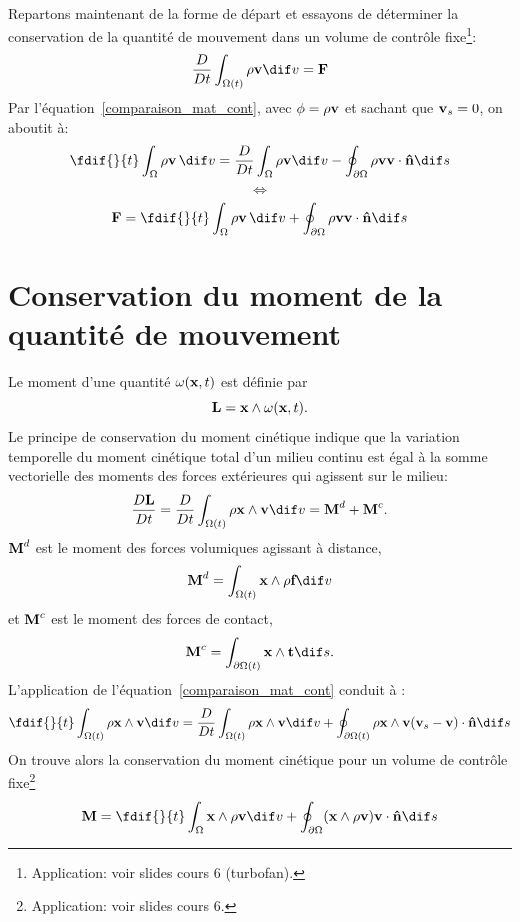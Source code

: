 \paragraph{}
Repartons maintenant de la forme de départ et essayons de déterminer la conservation de la quantité de mouvement dans un volume de contrôle fixe\footnote{Application: voir slides cours 6 (turbofan).}:
$$\frac{D}{Dt}\int_{\Omega(t)}\rho\fv{v} \dif v=\fv{F}$$
Par l'équation~\eqref{comparaison_mat_cont}, avec $\phi=\rho\textbf{v}$ et sachant que $\textbf{v}_s=0$, on aboutit à:
$$\fdif{}{t}\int_{\Omega }\rho\fv{v}\,  \dif v=\frac{D}{Dt}\int_{\Omega}\rho\fv{v} \dif v-\oint_{\partial\Omega }\rho\fv{v}\fv{v}\cdot\fv{\^n} \dif s$$
$$\Leftrightarrow$$
$$\fv{F}=\fdif{}{t}\int_{\Omega}\rho\fv{v}\,  \dif v+\oint_{\partial\Omega }\rho\fv{v}\fv{v}\cdot\fv{\^n} \dif s$$

\section{Conservation du moment de la quantité de mouvement}
Le moment d'une quantité $\omega(\textbf{x},t)$ est définie par $$\textbf{L}=\textbf{x}\wedge\omega(\textbf{x},t).$$
Le principe de conservation du moment cinétique indique que la variation temporelle du moment cinétique total  d'un milieu continu est égal à la somme vectorielle des moments des forces extérieures qui agissent sur le milieu:
$$\frac{D\fv{L}}{Dt}=\frac{D}{Dt}\int_{\Omega (t)}\rho\fv{x}\wedge\fv{v} \dif v=\fv{M}^d+\fv{M}^c.$$
$\textbf{M}^d$ est le moment des forces volumiques agissant à distance, $$\fv{M}^d=\int_{\Omega (t)}\fv{x}\wedge\rho\fv{f} \dif v$$ et $\textbf{M}^c$ est le moment des forces de contact,
$$\fv{M}^c=\int_{\partial\Omega (t)}\fv{x}\wedge\fv{t} \dif s.$$
L'application de l'équation~\eqref{comparaison_mat_cont} conduit à :
$$\fdif{}{t}\int_{\Omega (t)}\rho\fv{x}\wedge\fv{v} \dif v=\frac{D}{Dt}\int_{\Omega (t)}\rho\fv{x}\wedge\fv{v} \dif v+\oint_{\partial\Omega (t)}\rho\fv{x}\wedge\fv{v}(\fv{v}_s-\fv{v})\cdot\fv{\^n} \dif s$$
On trouve alors la conservation du moment cinétique pour un volume de contrôle fixe\footnote{Application: voir slides cours 6.}
$$\fv{M}=\fdif{}{t}\int_{\Omega}\fv{x}\wedge\rho\fv{v} \dif v+\oint_{\partial\Omega }(\fv{x}\wedge\rho\fv{v})\fv{v}\cdot\fv{\^n} \dif s$$
